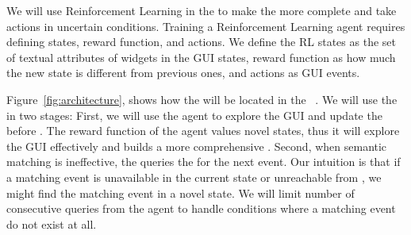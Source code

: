 \bigskip
We will use Reinforcement Learning in the \testreuse to make the \tam more complete and take actions in uncertain conditions.
Training a Reinforcement Learning agent requires defining  states, reward function, and actions.
We define the RL states as the set of textual attributes of widgets in the GUI states, reward function as how much the new state is different from previous ones, and actions as GUI events.

\bigskip
Figure~\ref{fig:architecture}, shows how the \rlaganet will be located in the \testreuse~\architecture.
We will use the \rlaganet in two stages: 
First, we will use the agent to explore the GUI and update the \tam before \testreuse.
The reward function of the agent values novel states, thus it will explore the GUI effectively and builds a more comprehensive \tam.
Second, when semantic matching is ineffective, the \selector queries the \rlaganet for the next event.
Our intuition is that if a matching event is unavailable in the current state or unreachable from \tam, we might find the matching event in a novel state.
We will limit number of consecutive queries from the agent to handle conditions where a matching event do not exist at all.



